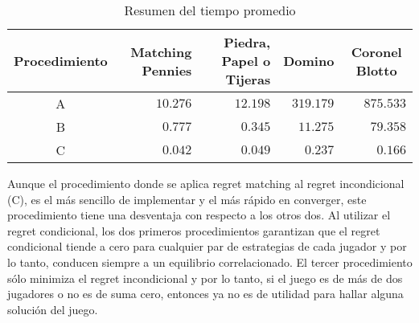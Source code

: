 \begin{table}[ht]
    \centering
    \begin{tabular}{c|r|r|r|r}
       \scriptsize{Procedimiento}  & \scriptsize{Matching Pennies} & \scriptsize{Piedra, Papel o Tijeras} & \multicolumn{1}{c|}{\scriptsize{Domino}} & \multicolumn{1}{c}{\scriptsize{Coronel Blotto}}  \\ \hline
       A & $10.276$ & $12.198$ & $319.179$ & $875.533$ \\
       B & $0.777$   & $0.345$ & $11.275$ & $79.358$ \\
       C & $0.042$   & $0.049$ & $0.237$ & $0.166$ \\ \hline
    \end{tabular}
    \caption{Resumen del tiempo promedio}
    \label{tab:resumen-tiempo}
\end{table}

Aunque el procedimiento donde se aplica regret matching al regret incondicional (C), es el más sencillo de implementar y el más rápido en converger, este procedimiento tiene una desventaja con respecto a los otros dos. Al utilizar el regret condicional, los dos primeros procedimientos garantizan que el regret condicional tiende a cero para cualquier par de estrategias de cada jugador y por lo tanto, conducen siempre a un equilibrio correlacionado. El tercer procedimiento sólo minimiza el regret incondicional y por lo tanto, si el juego es de más de dos jugadores o no es de suma cero, entonces ya no es de utilidad para hallar alguna solución del juego.